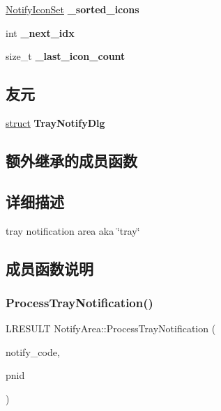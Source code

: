 \begin{DoxyCompactItemize}
\item 
\mbox{\label{struct_notify_area_a9af6703468f616dda62e6ccfd91cd498}} 
\hyperlink{classset}{Notify\+Icon\+Set} {\bfseries \+\_\+sorted\+\_\+icons}
\item 
\mbox{\label{struct_notify_area_a002fcfe2485e78e9e41e5810b753e280}} 
int {\bfseries \+\_\+next\+\_\+idx}
\item 
\mbox{\label{struct_notify_area_a18e30f89be98f8c6347ba52d9da8ee4e}} 
size\+\_\+t {\bfseries \+\_\+last\+\_\+icon\+\_\+count}
\end{DoxyCompactItemize}
\subsection*{友元}
\begin{DoxyCompactItemize}
\item 
\mbox{\label{struct_notify_area_a0a678cf3b1934244e5e281997af290b6}} 
\hyperlink{interfacestruct}{struct} {\bfseries Tray\+Notify\+Dlg}
\end{DoxyCompactItemize}
\subsection*{额外继承的成员函数}


\subsection{详细描述}
tray notification area aka \char`\"{}tray\char`\"{} 

\subsection{成员函数说明}
\mbox{\label{struct_notify_area_a60932b40496653a975e3a71d7f4b92c8}} 
\subsubsection{\texorpdfstring{Process\+Tray\+Notification()}{ProcessTrayNotification()}}
{\footnotesize\ttfamily L\+R\+E\+S\+U\+LT Notify\+Area\+::\+Process\+Tray\+Notification (\begin{DoxyParamCaption}\item[{int}]{notify\+\_\+code,  }\item[{\hyperlink{struct___n_o_t_i_f_y_i_c_o_n_d_a_t_a_a}{N\+O\+T\+I\+F\+Y\+I\+C\+O\+N\+D\+A\+TA} $\ast$}]{pnid }\end{DoxyParamCaption})}


